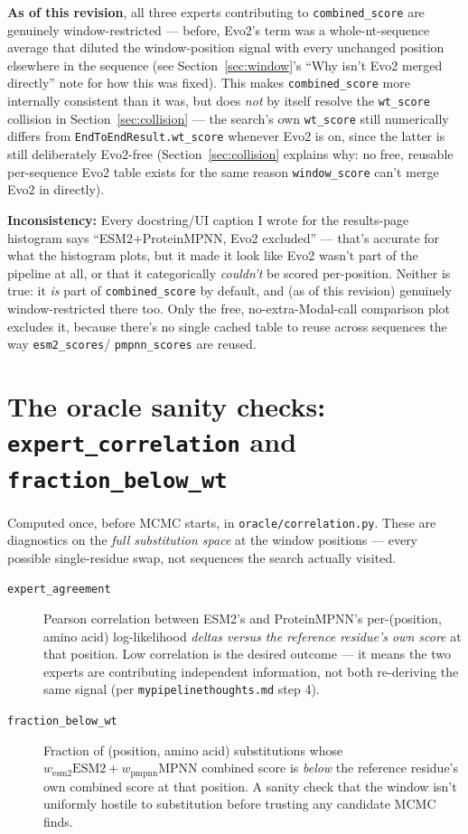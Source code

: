 \documentclass[11pt]{article}
\newcommand{\warnbox}[1]{%
  \par\noindent\colorbox{warnbg}{\parbox{\dimexpr\linewidth-2\fboxsep}{\textbf{Inconsistency:} #1}}\par\vspace{4pt}
}
\begin{document}
\textbf{As of this revision}, all three experts contributing to
\texttt{combined\_score} are genuinely window-restricted --- before, Evo2's
term was a whole-nt-sequence average that diluted the window-position signal
with every unchanged position elsewhere in the sequence (see
Section~\ref{sec:window}'s ``Why isn't Evo2 merged directly'' note for how
this was fixed). This makes \texttt{combined\_score} more internally
consistent than it was, but does \emph{not} by itself resolve the
\texttt{wt\_score} collision in Section~\ref{sec:collision} --- the search's
own \texttt{wt\_score} still numerically differs from
\texttt{EndToEndResult.wt\_score} whenever Evo2 is on, since the latter is
still deliberately Evo2-free (Section~\ref{sec:collision} explains why: no
free, reusable per-sequence Evo2 table exists for the same reason
\texttt{window\_score} can't merge Evo2 in directly).

\warnbox{Every docstring/UI caption I wrote for the results-page histogram
says ``ESM2+ProteinMPNN, Evo2 excluded'' --- that's accurate for what the
histogram plots, but it made it look like Evo2 wasn't part of the pipeline at
all, or that it categorically \emph{couldn't} be scored per-position. Neither
is true: it \emph{is} part of \texttt{combined\_score} by default, and (as of
this revision) genuinely window-restricted there too. Only the free,
no-extra-Modal-call comparison plot excludes it, because there's no single
cached table to reuse across sequences the way \texttt{esm2\_scores}/
\texttt{pmpnn\_scores} are reused.}

\section{The oracle sanity checks: \texttt{expert\_correlation} and \texttt{fraction\_below\_wt}}
\label{sec:sanity}

Computed once, before MCMC starts, in \texttt{oracle/correlation.py}. These
are diagnostics on the \emph{full substitution space} at the window
positions --- every possible single-residue swap, not sequences the search
actually visited.

\begin{description}
  \item[\texttt{expert\_agreement}] Pearson correlation between ESM2's and
    ProteinMPNN's per-(position, amino acid) log-likelihood \emph{deltas
    versus the reference residue's own score} at that position. Low
    correlation is the desired outcome --- it means the two experts are
    contributing independent information, not both re-deriving the same
    signal (per \texttt{mypipelinethoughts.md} step 4).
  \item[\texttt{fraction\_below\_wt}] Fraction of (position, amino acid)
    substitutions whose $w_{\text{esm2}}\text{ESM2} + w_{\text{pmpnn}}\text{MPNN}$
    combined score is \emph{below} the reference residue's own combined
    score at that position. A sanity check that the window isn't
    uniformly hostile to substitution before trusting any candidate MCMC
    finds.
\end{description}
\end{document}
